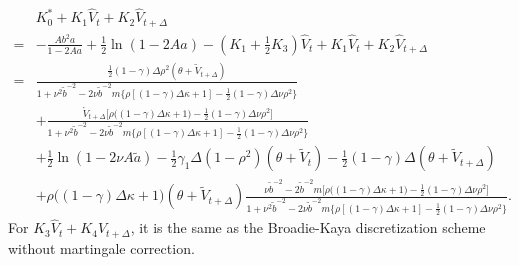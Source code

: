 \documentclass{ws-ijfe}
\begin{document}
\begin{equation*}
  \begin{split}
    &K_0^*+K_1\hat{V}_t+K_2\hat{V}_{t+\Delta}\\
    =&-\frac{Ab^2a}{1-2Aa}+\frac{1}{2}\ln(1-2Aa)-(K_1+\frac{1}{2}K_3)\hat{V}_t+K_1\hat{V}_t+K_2\hat{V}_{t+\Delta}\\
  =&\frac{\frac{1}{2}(1-\gamma)\Delta\rho^2(\theta+\tilde{V}_{t+\Delta})}{1+\nu^2\tilde{b}^{-2}-2\nu\tilde{b}^{-2}m\{\rho[(1-\gamma)\Delta\kappa+1]-\frac{1}{2}(1-\gamma)\Delta\nu\rho^2\big\}}\\
  &+\frac{\mathring{V}_{t+\Delta}\big[\rho\big((1-\gamma)\Delta\kappa+1\big)-\frac{1}{2}(1-\gamma)\Delta\nu\rho^2\big]}{1+\nu^2\tilde{b}^{-2}-2\nu\tilde{b}^{-2}m\{\rho[(1-\gamma)\Delta\kappa+1]-\frac{1}{2}(1-\gamma)\Delta\nu\rho^2\big\}}\\
  &+\frac{1}{2}\ln(1-2\nu A\tilde{a})-\frac{1}{2}\gamma_1\Delta(1-\rho^2)(\theta+\tilde{V}_t)-\frac{1}{2}(1-\gamma)\Delta(\theta+\tilde{V}_{t+\Delta})\\
  &+\rho\big((1-\gamma)\Delta\kappa+1\big)(\theta+\tilde{V}_{t+\Delta})\frac{\nu\tilde{b}^{-2}-2\tilde{b}^{-2}m\big[\rho\big((1-\gamma)\Delta\kappa+1\big)-\frac{1}{2}(1-\gamma)\Delta\nu\rho^2\big]}{1+\nu^2\tilde{b}^{-2}-2\nu\tilde{b}^{-2}m\{\rho[(1-\gamma)\Delta\kappa+1]-\frac{1}{2}(1-\gamma)\Delta\nu\rho^2\big\}}.
\end{split}
\end{equation*}
For $K_3\hat{V}_t+K_4\hat{V}_{t+\Delta}$, it is the same as the Broadie-Kaya discretization scheme without martingale correction.\\
\end{document}
